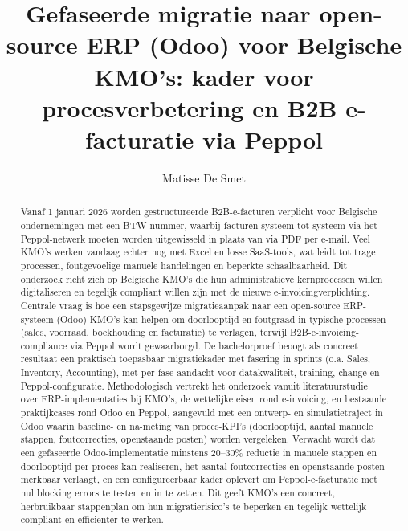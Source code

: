 \documentclass{hogent-article}
\title{Gefaseerde migratie naar open-source ERP (Odoo) voor Belgische KMO's: kader voor procesverbetering en B2B e-facturatie via Peppol}
\author{Matisse De Smet}
\begin{document}
\begin{abstract}
Vanaf 1 januari 2026 worden gestructureerde B2B-e-facturen verplicht voor Belgische ondernemingen met een BTW-nummer, waarbij facturen systeem-tot-systeem via het Peppol-netwerk moeten worden uitgewisseld in plaats van via PDF per e-mail. Veel KMO's werken vandaag echter nog met Excel en losse SaaS-tools, wat leidt tot trage processen, foutgevoelige manuele handelingen en beperkte schaalbaarheid. Dit onderzoek richt zich op Belgische KMO's die hun administratieve kernprocessen willen digitaliseren en tegelijk compliant willen zijn met de nieuwe e-invoicingverplichting. Centrale vraag is hoe een stapsgewijze migratieaanpak naar een open-source ERP-systeem (Odoo) KMO's kan helpen om doorlooptijd en foutgraad in typische processen (sales, voorraad, boekhouding en facturatie) te verlagen, terwijl B2B-e-invoicing-compliance via Peppol wordt gewaarborgd. De bachelorproef beoogt als concreet resultaat een praktisch toepasbaar migratiekader met fasering in sprints (o.a. Sales, Inventory, Accounting), met per fase aandacht voor datakwaliteit, training, change en Peppol-configuratie. Methodologisch vertrekt het onderzoek vanuit literatuurstudie over ERP-implementaties bij KMO's, de wettelijke eisen rond e-invoicing, en bestaande praktijkcases rond Odoo en Peppol, aangevuld met een ontwerp- en simulatietraject in Odoo waarin baseline- en na-meting van proces-KPI's (doorlooptijd, aantal manuele stappen, foutcorrecties, openstaande posten) worden vergeleken. Verwacht wordt dat een gefaseerde Odoo-implementatie minstens 20--30\% reductie in manuele stappen en doorlooptijd per proces kan realiseren, het aantal foutcorrecties en openstaande posten merkbaar verlaagt, en een configureerbaar kader oplevert om Peppol-e-facturatie met nul blocking errors te testen en in te zetten. Dit geeft KMO's een concreet, herbruikbaar stappenplan om hun migratierisico's te beperken en tegelijk wettelijk compliant en efficiënter te werken.
\end{abstract}


\tableofcontents



\printbibliography[heading=bibintoc]
\end{document}
